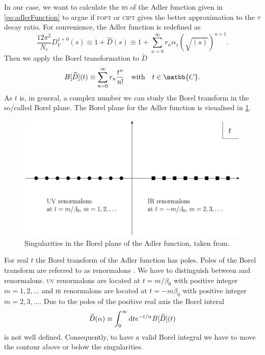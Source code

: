 \documentclass[../../index.tex]{subfiles}
\begin{document}
In our case, we want to calculate the \textsc{bs} of the Adler function given in
\cref{eq:adlerFunction} to argue if \textsc{fopt} or \textsc{cipt} gives the
better approximation to the \(\tau\) decay ratio. For convenience, the Adler
function is redefined as
\begin{equation}
  \frac{12 \pi^2}{N_c} D_V^{1+0}(s) \equiv 1 + \widehat D(s) \equiv 1 + \sum_{n=0}^{\infty} r_n \alpha_s(\sqrt{(s)})^{n+1}.
\end{equation}
Then we apply the Borel transformation to \(\widetilde D\)
\begin{equation}
  B[\widehat D](t) \equiv \sum_{n=0}^{\infty} r_n \frac{t^n}{n!} \quad \text{with} \quad t \in \matbb{C}.
\end{equation}
As \(t\) is, in general, a complex number we can study the Borel transform in
the so\-/called Borel plane. The Borel plane for the Adler function is
visualised in \cref{fig:borelPlane}.
\begin{figure}
  \centering \includegraphics[width=\textwidth]{./images/borelPlane.eps}
  \caption{Singularities in the Borel plane of the Adler function, taken
    from\cite{Beneke1998}.}
  \label{fig:borelPlane}
\end{figure}
For real \(t\) the Borel transform of the Adler function has poles. Poles of
the Borel transform are referred to as renormalons \cite{Beneke1999,
  Zichichi1979}. We have to distinguish between  and
 renormalons. \textsc{uv} renormalons are located at
\(t=m/\beta_0\) with positive integer \(m=1,2,\dots\) and \textsc{ir}
renormalons are located at \(t=-m\beta_0\) with positive integer
\(m=2,3,\dots\). Due to the poles of the positive real axis the Borel interal
\begin{equation}
  \widehat D(\alpha) \equiv \int_0^\infty \dif t e^{-t/\alpha} B[\widehat D](t)
\end{equation}
is not well defined. Consequently, to have a valid Borel integral we have to
move the contour above or below the singularities.
\end{document}
